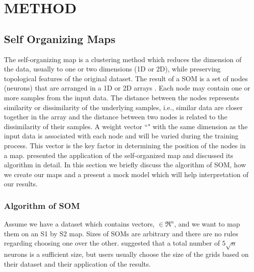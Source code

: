 
\section{METHOD}
\label{sec: method}
 \subsection{Self Organizing Maps}
 \label{sec: som}
 
 The self-organizing map is a clustering method which reduces the dimension of the data, usually to one or two dimensions (1D or 2D), while preserving topological features of the original dataset.
 The result of a SOM is a set of nodes (neurons) that are arranged in a 1D or 2D arrays \citep{Kohonen98}. 
 Each node may contain one or more samples from the input data.
 The distance between the nodes represents similarity or dissimilarity of the underlying samples, i.e., similar data are closer together in the array and the distance between two nodes is related to the dissimilarity of their samples.
 A weight vector ``" with the same dimension as the input data is associated with each node and will be varied during the training process.
 This vector is the key factor in determining the position of the nodes in a map.
 \cite{Geach12} presented the application of the self-organized map and discussed its algorithm in detail.
 In this section we briefly discuss the algorithm of SOM, how we create our maps and a present a mock model which will help interpretation of our results. 
 
 \subsubsection{Algorithm of SOM} 
 \label{sec: algorithm}
     Assume we have a dataset which contains vectors,  $\in \Re^n$, and we want to map them on an S1 by S2 map. 
     Sizes of SOMs are arbitrary and there are no rules regarding choosing one over the other. 
    \citet{Vesanto05} suggested that a total number of $5\sqrt{n}$ neurons is a sufficient size, but users usually choose the size of the grids based on their dataset and their application of the results.

